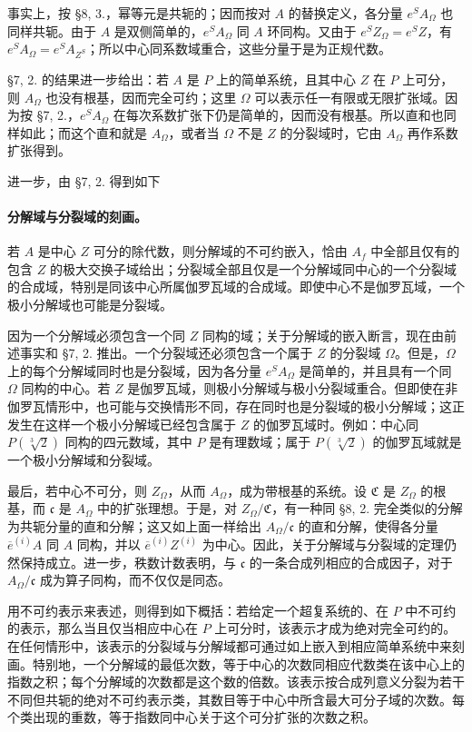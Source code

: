 事实上，按 §8, 3.，幂等元是共轭的；因而按对 \(A\) 的替换定义，各分量 \(e^S A_\Omega\) 也同样共轭。由于 \(A\) 是双侧简单的，\(e^S A_\Omega\) 同 \(A\) 环同构。又由于 \(e^S Z_\Omega=e^S Z\)，有 \(e^S A_\Omega=e^S A_{Z^S}\)；所以中心同系数域重合，这些分量于是为正规代数。

§7, 2. 的结果进一步给出：若 \(A\) 是 \(P\) 上的简单系统，且其中心 \(Z\) 在 \(P\) 上可分，则 \(A_\Omega\) 也没有根基，因而完全可约；这里 \(\Omega\) 可以表示任一有限或无限扩张域。因为按 §7, 2.，\(e^S A_\Omega\) 在每次系数扩张下仍是简单的，因而没有根基。所以直和也同样如此；而这个直和就是 \(A_\Omega\)，或者当 \(\Omega\) 不是 \(Z\) 的分裂域时，它由 \(A_\Omega\) 再作系数扩张得到。

进一步，由 §7, 2. 得到如下

\paragraph{分解域与分裂域的刻画。}
若 \(A\) 是中心 \(Z\) 可分的除代数，则分解域的不可约嵌入，恰由 \(A_f\) 中全部且仅有的包含 \(Z\) 的极大交换子域给出；分裂域全部且仅是一个分解域同中心的一个分裂域的合成域，特别是同该中心所属伽罗瓦域的合成域。即使中心不是伽罗瓦域，一个极小分解域也可能是分裂域。

因为一个分解域必须包含一个同 \(Z\) 同构的域；关于分解域的嵌入断言，现在由前述事实和 §7, 2. 推出。一个分裂域还必须包含一个属于 \(Z\) 的分裂域 \(\Omega\)。但是，\(\Omega\) 上的每个分解域同时也是分裂域，因为各分量 \(e^S A_\Omega\) 是简单的，并且具有一个同 \(\Omega\) 同构的中心。若 \(Z\) 是伽罗瓦域，则极小分解域与极小分裂域重合。但即使在非伽罗瓦情形中，也可能与交换情形不同，存在同时也是分裂域的极小分解域；这正发生在这样一个极小分解域已经包含属于 \(Z\) 的伽罗瓦域时。例如：中心同 \(P(\sqrt[3]{2})\) 同构的四元数域，其中 \(P\) 是有理数域；属于 \(P(\sqrt[3]{2})\) 的伽罗瓦域就是一个极小分解域和分裂域。

最后，若中心不可分，则 \(Z_\Omega\)，从而 \(A_\Omega\)，成为带根基的系统。设 \(\mathfrak C\) 是 \(Z_\Omega\) 的根基，而 \(\mathfrak c\) 是 \(A_\Omega\) 中的扩张理想。于是，对 \(Z_\Omega/\mathfrak C\)，有一种同 §8, 2. 完全类似的分解为共轭分量的直和分解；这又如上面一样给出 \(A_\Omega/\mathfrak c\) 的直和分解，使得各分量 \(\overline e^{(i)}A\) 同 \(A\) 同构，并以 \(\overline e^{(i)}Z^{(i)}\) 为中心。因此，关于分解域与分裂域的定理仍然保持成立。进一步，秩数计数表明，与 \(\mathfrak c\) 的一条合成列相应的合成因子，对于 \(A_\Omega/\mathfrak c\) 成为算子同构，而不仅仅是同态。

用不可约表示来表述，则得到如下概括：若给定一个超复系统的、在 \(P\) 中不可约的表示，那么当且仅当相应中心在 \(P\) 上可分时，该表示才成为绝对完全可约的。在任何情形中，该表示的分裂域与分解域都可通过如上嵌入到相应简单系统中来刻画。特别地，一个分解域的最低次数，等于中心的次数同相应代数类在该中心上的指数之积；每个分解域的次数都是这个数的倍数。该表示按合成列意义分裂为若干不同但共轭的绝对不可约表示类，其数目等于中心中所含最大可分子域的次数。每个类出现的重数，等于指数同中心关于这个可分扩张的次数之积。

